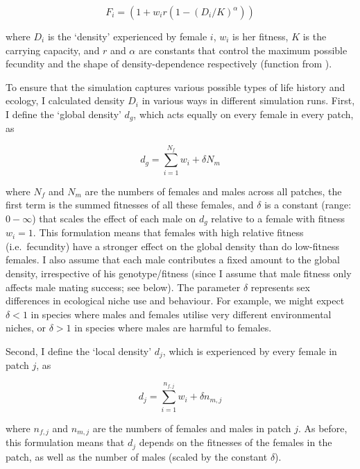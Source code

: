 \documentclass[]{rsos}%
\begin{document}
\begin{equation}
\tag{1}
F_i = (1 + w_i r(1 - (D_i / K) ^ \alpha))
\end{equation}

where \(D_i\) is the `density' experienced by female \(i\), \(w_i\) is
her fitness, \(K\) is the carrying capacity, and \(r\) and \(\alpha\)
are constants that control the maximum possible fecundity and the shape
of density-dependence respectively (function from \citep{fowler1981de}).

To ensure that the simulation captures various possible types of life
history and ecology, I calculated density \(D_i\) in various ways in
different simulation runs. First, I define the `global density' \(d_g\),
which acts equally on every female in every patch, as

\begin{equation}
\tag{2}
d_g = \sum_{i=1}^{N_f} w_i + \delta N_m
\end{equation}

where \(N_f\) and \(N_m\) are the numbers of females and males across
all patches, the first term is the summed fitnesses of all these
females, and \(\delta\) is a constant (range: \(0-\infty\)) that scales
the effect of each male on \(d_g\) relative to a female with fitness
\(w_i = 1\). This formulation means that females with high relative
fitness (i.e.~fecundity) have a stronger effect on the global density
than do low-fitness females. I also assume that each male contributes a
fixed amount to the global density, irrespective of his genotype/fitness
(since I assume that male fitness only affects male mating success; see
below). The parameter \(\delta\) represents sex differences in
ecological niche use and behaviour. For example, we might expect
\(\delta<1\) in species where males and females utilise very different
environmental niches, or \(\delta>1\) in species where males are harmful
to females.

Second, I define the `local density' \(d_j\), which is experienced by
every female in patch \(j\), as

\begin{equation}
\tag{3}
d_j = \sum_{i=1}^{n_{f,j}} w_i + \delta n_{m,j}
\end{equation}

where \(n_{f,j}\) and \(n_{m,j}\) are the numbers of females and males
in patch \(j\). As before, this formulation means that \(d_j\) depends
on the fitnesses of the females in the patch, as well as the number of
males (scaled by the constant \(\delta\)).
\end{document}
